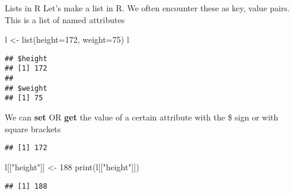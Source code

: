 \documentclass[
  10pt,
  ignorenonframetext,
  aspectratio=169]{beamer}
\newenvironment{Shaded}{\begin{snugshade}}{\end{snugshade}}
\newcommand{\AttributeTok}[1]{\textcolor[rgb]{0.80,0.80,0.80}{#1}}
\newcommand{\DecValTok}[1]{\textcolor[rgb]{0.86,0.86,0.80}{#1}}
\newcommand{\FunctionTok}[1]{\textcolor[rgb]{0.94,0.94,0.56}{#1}}
\newcommand{\NormalTok}[1]{\textcolor[rgb]{0.80,0.80,0.80}{#1}}
\newcommand{\OtherTok}[1]{\textcolor[rgb]{0.94,0.94,0.56}{#1}}
\newcommand{\SpecialCharTok}[1]{\textcolor[rgb]{0.86,0.64,0.64}{#1}}
\newcommand{\StringTok}[1]{\textcolor[rgb]{0.80,0.58,0.58}{#1}}
\begin{document}
\begin{frame}[fragile]{Lists in R}
\protect\hypertarget{lists-in-r}{}
Let's make a list in R. We often encounter these as key, value pairs.
This is a list of named attributes

\scriptsize

\begin{Shaded}
\begin{Highlighting}[]
\NormalTok{l }\OtherTok{\textless{}{-}} \FunctionTok{list}\NormalTok{(}\AttributeTok{height=}\DecValTok{172}\NormalTok{, }\AttributeTok{weight=}\DecValTok{75}\NormalTok{)}
\NormalTok{l}
\end{Highlighting}
\end{Shaded}

\begin{verbatim}
## $height
## [1] 172
## 
## $weight
## [1] 75
\end{verbatim}

\normalsize

We can \textbf{set} OR \textbf{get} the value of a certain attribute
with the \$ sign or with square brackets

\scriptsize

\begin{Shaded}
\end{Shaded}

\begin{verbatim}
## [1] 172
\end{verbatim}

\begin{Shaded}
\begin{Highlighting}[]
\NormalTok{l[[}\StringTok{"height"}\NormalTok{]] }\OtherTok{\textless{}{-}} \DecValTok{188}
\FunctionTok{print}\NormalTok{(l[[}\StringTok{"height"}\NormalTok{]])}
\end{Highlighting}
\end{Shaded}

\begin{verbatim}
## [1] 188
\end{verbatim}
\end{frame}
\end{document}
